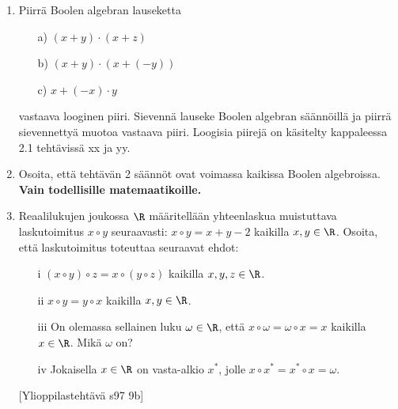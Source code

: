 \begin{enumerate}
\item
Piirrä Boolen algebran lauseketta
\begin{itemize}
\item[a)] $(x + y) \cdot (x + z)$
\item[b)] $(x + y) \cdot (x + (-y))$
\item[c)] $x + (-x) \cdot y$
\end{itemize}
vastaava looginen piiri. Sievennä lauseke Boolen algebran säännöillä ja piirrä sievennettyä muotoa vastaava piiri. Loogisia piirejä on käsitelty kappaleessa 2.1 tehtävissä xx ja yy.

\item
Osoita, että tehtävän 2 säännöt ovat voimassa kaikissa Boolen algebroissa.
{\bf Vain todellisille matemaatikoille.}

\item
Reaalilukujen joukossa $\R$ määritellään yhteenlaskua muistuttava laskutoimitus $x \circ y$ seuraavasti: $x \circ y = x + y - 2$ kaikilla $x, y \in \R$. Osoita, että laskutoimitus toteuttaa seuraavat ehdot: 
\begin{itemize}
\item[i]
$(x \circ y) \circ z = x \circ (y \circ z)$ kaikilla $x, y, z \in \R$. 
\item[ii]
$x \circ y = y \circ x$ kaikilla $x, y \in \R$. 
\item[iii]
On olemassa sellainen luku $\omega \in \R$, että $x \circ \omega = \omega \circ x = x$ kaikilla $x \in \R$. Mikä $\omega$ on? 
\item[iv]
Jokaisella $x \in \R$ on vasta-alkio $x^*$, jolle $x \circ x^* = x^* \circ x = \omega$. 
\end{itemize}
[Ylioppilastehtävä s97 9b]

\end{enumerate}







